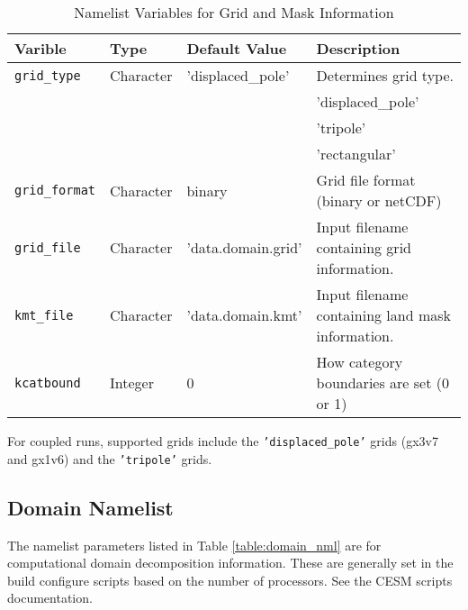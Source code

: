 \begin{table}
  \begin{center}
  \caption{Namelist Variables for Grid and Mask Information}
  \label{table:grid_nml}
  \begin{tabular}{p{2.5cm}p{2.5cm}p{3cm}p{6.0cm}} \hline
  Varible & Type & Default Value & Description               \\
\hline \hline

{\tt grid\_type} &  Character & 'displaced\_pole' &  Determines grid type. \\
          &            &   &  'displaced\_pole' \\
          &            &   &  'tripole' \\
          &            &   &  'rectangular' \\

{\tt grid\_format} & Character & binary & Grid file format (binary or netCDF) \\

{\tt grid\_file} &  Character & 'data.domain.grid' &  Input filename
                                           containing grid information. \\

{\tt kmt\_file} &  Character & 'data.domain.kmt' &  Input filename
                                       containing land mask information. \\

{\tt kcatbound} & Integer & 0 & How category boundaries are set (0 or 1) \\

  \hline
  \end{tabular}
  \end{center}
\end{table}

For coupled runs, supported grids include the {\tt 'displaced\_pole'} grids 
(gx3v7 and gx1v6) and the {\tt 'tripole'} grids.

\subsection{Domain Namelist}

The namelist parameters listed in Table \ref{table:domain_nml} are for
computational domain decomposition information. These are generally set in
the build configure scripts based on the number of processors. See the CESM
scripts documentation.

